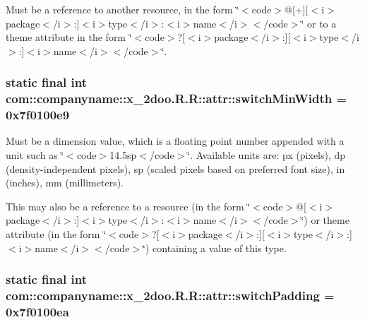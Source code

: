 Must be a reference to another resource, in the form \char`\"{}$<$code$>$@\mbox{[}+\mbox{]}\mbox{[}$<$i$>$package$<$/i$>$:\mbox{]}$<$i$>$type$<$/i$>$:$<$i$>$name$<$/i$>$$<$/code$>$\char`\"{} or to a theme attribute in the form \char`\"{}$<$code$>$?\mbox{[}$<$i$>$package$<$/i$>$:\mbox{]}\mbox{[}$<$i$>$type$<$/i$>$:\mbox{]}$<$i$>$name$<$/i$>$$<$/code$>$\char`\"{}. \hypertarget{classcom_1_1companyname_1_1x__2doo_1_1_r_1_1attr_b03b9debfb09d95296202adad4c927fc}{
\subsubsection[{switchMinWidth}]{\setlength{\rightskip}{0pt plus 5cm}static final int com::companyname::x\_\-2doo.R.R::attr::switchMinWidth = 0x7f0100e9}}
\label{classcom_1_1companyname_1_1x__2doo_1_1_r_1_1attr_b03b9debfb09d95296202adad4c927fc}


Must be a dimension value, which is a floating point number appended with a unit such as \char`\"{}$<$code$>$14.5sp$<$/code$>$\char`\"{}. Available units are: px (pixels), dp (density-independent pixels), sp (scaled pixels based on preferred font size), in (inches), mm (millimeters). 

This may also be a reference to a resource (in the form \char`\"{}$<$code$>$@\mbox{[}$<$i$>$package$<$/i$>$:\mbox{]}$<$i$>$type$<$/i$>$:$<$i$>$name$<$/i$>$$<$/code$>$\char`\"{}) or theme attribute (in the form \char`\"{}$<$code$>$?\mbox{[}$<$i$>$package$<$/i$>$:\mbox{]}\mbox{[}$<$i$>$type$<$/i$>$:\mbox{]}$<$i$>$name$<$/i$>$$<$/code$>$\char`\"{}) containing a value of this type. \hypertarget{classcom_1_1companyname_1_1x__2doo_1_1_r_1_1attr_1e66affd3e0c2e3e52c1eb8fb8acac00}{
\subsubsection[{switchPadding}]{\setlength{\rightskip}{0pt plus 5cm}static final int com::companyname::x\_\-2doo.R.R::attr::switchPadding = 0x7f0100ea}}
\label{classcom_1_1companyname_1_1x__2doo_1_1_r_1_1attr_1e66affd3e0c2e3e52c1eb8fb8acac00}


